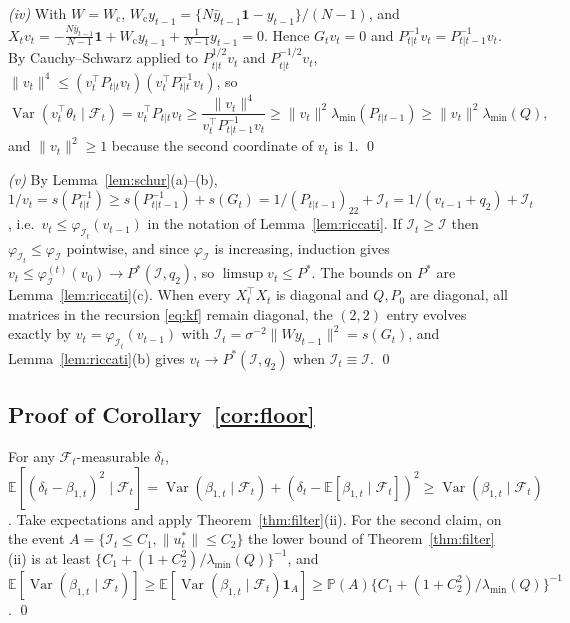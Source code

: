 \documentclass[12pt]{article}
\theoremstyle{plain}
\theoremstyle{definition}
\theoremstyle{remark}
\newcommand{\E}{\mathbb{E}}
\newcommand{\Prob}{\mathbb{P}}
\newcommand{\Var}{\operatorname{Var}}
\newcommand{\one}{\mathbf{1}}
\newcommand{\calF}{\mathcal{F}}
\newcommand{\calI}{\mathcal{I}}
\newcommand{\Wc}{W_{\mathrm{c}}}
\newcommand{\T}{^{\top}}
\begin{document}
\emph{(iv)} With $W=\Wc$, $\Wc y_{t-1}=\{N\bar y_{t-1}\one-y_{t-1}\}/(N-1)$, and $X_tv_t=-\tfrac{N\bar y_{t-1}}{N-1}\one+\Wc y_{t-1}+\tfrac{1}{N-1}y_{t-1}=0$. Hence $G_tv_t=0$ and $P_{t|t}^{-1}v_t=P_{t|t-1}^{-1}v_t$. By Cauchy--Schwarz applied to $P_{t|t}^{1/2}v_t$ and $P_{t|t}^{-1/2}v_t$, $\|v_t\|^4\le(v_t\T P_{t|t}v_t)(v_t\T P_{t|t}^{-1}v_t)$, so
\[
\Var(v_t\T\theta_t\mid\calF_t)=v_t\T P_{t|t}v_t\ge\frac{\|v_t\|^4}{v_t\T P_{t|t-1}^{-1}v_t}\ge\|v_t\|^2\lambda_{\min}(P_{t|t-1})\ge\|v_t\|^2\lambda_{\min}(Q),
\]
and $\|v_t\|^2\ge1$ because the second coordinate of $v_t$ is $1$. \qed

\emph{(v)} By Lemma~\ref{lem:schur}(a)--(b), $1/v_t=s(P_{t|t}^{-1})\ge s(P_{t|t-1}^{-1})+s(G_t)=1/(P_{t|t-1})_{22}+\calI_t=1/(v_{t-1}+q_2)+\calI_t$, i.e.\ $v_t\le\varphi_{\calI_t}(v_{t-1})$ in the notation of Lemma~\ref{lem:riccati}. If $\calI_t\ge\calI$ then $\varphi_{\calI_t}\le\varphi_{\calI}$ pointwise, and since $\varphi_\calI$ is increasing, induction gives $v_t\le\varphi_\calI^{(t)}(v_0)\to P^\ast(\calI,q_2)$, so $\limsup v_t\le P^\ast$. The bounds on $P^\ast$ are Lemma~\ref{lem:riccati}(c). When every $X_t\T X_t$ is diagonal and $Q,P_0$ are diagonal, all matrices in the recursion \eqref{eq:kf} remain diagonal, the $(2,2)$ entry evolves exactly by $v_t=\varphi_{\calI_t}(v_{t-1})$ with $\calI_t=\sigma^{-2}\|Wy_{t-1}\|^2=s(G_t)$, and Lemma~\ref{lem:riccati}(b) gives $v_t\to P^\ast(\calI,q_2)$ when $\calI_t\equiv\calI$. \qed

\subsection{Proof of Corollary~\ref{cor:floor}}
For any $\calF_t$-measurable $\delta_t$, $\E[(\delta_t-\beta_{1,t})^2\mid\calF_t]=\Var(\beta_{1,t}\mid\calF_t)+(\delta_t-\E[\beta_{1,t}\mid\calF_t])^2\ge\Var(\beta_{1,t}\mid\calF_t)$. Take expectations and apply Theorem~\ref{thm:filter}(ii). For the second claim, on the event $A=\{\calI_t\le C_1,\|u_t^*\|\le C_2\}$ the lower bound of Theorem~\ref{thm:filter}(ii) is at least $\{C_1+(1+C_2^2)/\lambda_{\min}(Q)\}^{-1}$, and $\E[\Var(\beta_{1,t}\mid\calF_t)]\ge\E[\Var(\beta_{1,t}\mid\calF_t)\one_A]\ge\Prob(A)\{C_1+(1+C_2^2)/\lambda_{\min}(Q)\}^{-1}$. \qed
\end{document}
